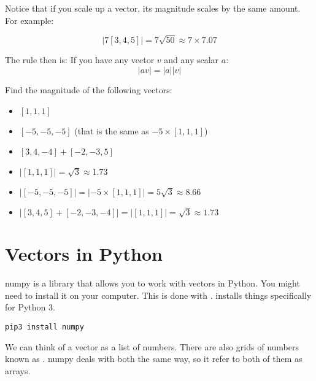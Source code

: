 Notice that if you scale up a vector, its magnitude scales by the same amount.  For example:

\begin{equation*}
|7[3,4,5]| = 7 \sqrt{50} \approx 7 \times 7.07    
\end{equation*}

The rule then is: If you have any vector $v$ and any scalar $a$:
\begin{equation*}
    |a v| = |a| |v|
\end{equation*}


\begin{Exercise}[title={Magnitude of a Vector}, label=vector_mag]
    Find the magnitude of the following vectors:
    \begin{itemize}
        \item $[1, 1, 1]$
        \item $[-5, -5, -5]$ (that is the same as $-5 \times [1, 1, 1]$)
        \item $[3, 4, -4] + [-2, -3, 5]$
    \end{itemize}
    \end{Exercise}
    \begin{Answer}[ref=vector_mag]
        \begin{itemize}
            \item $|[1, 1, 1]| = \sqrt{3} \approx 1.73 $
            \item $|[-5, -5, -5]| = |-5 \times [1,1,1]| = 5 \sqrt{3} \approx 8.66$
            \item $|[3, 4, 5] + [-2, -3, -4]| = | [1,1,1] | = \sqrt{3} \approx 1.73$ 
        \end{itemize}
    \end{Answer}

\section{Vectors in Python}

numpy is a library that allows you to work with vectors in Python.  
You might need to install it on your computer. This is done with . 
 installs things specifically for Python 3.

\begin{Verbatim}
pip3 install numpy
\end{Verbatim}

We can think of a vector as a list of numbers.  
There are also grids of numbers known as . numpy deals with both the same way, 
so it refer to both of them as arrays.

